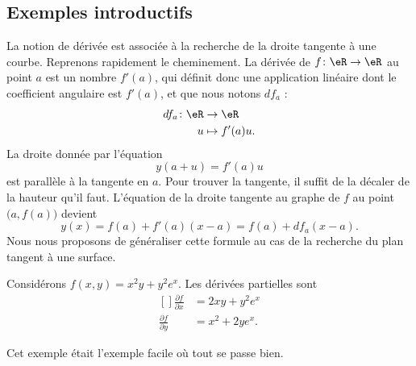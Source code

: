 \subsection{Exemples introductifs}
\label{SEBSECooLPRQooJRQCFL}

La notion de dérivée est associée à la recherche de la droite tangente à une courbe. Reprenons rapidement le cheminement. La dérivée de \( f\colon \eR\to \eR\) au point \( a\) est un nombre \( f'(a)\), qui définit donc une application linéaire dont le coefficient angulaire est \( f'(a)\), et que nous notons \( df_a\) :
\begin{equation}
	\begin{aligned}
		df_a\colon \eR & \to \eR         \\
		u              & \mapsto f'(a)u.
	\end{aligned}
\end{equation}
La droite donnée par l'équation
\begin{equation}
	y(a+u)=f'(a)u
\end{equation}
est parallèle à la tangente en \( a\). Pour trouver la tangente, il suffit de la décaler de la hauteur qu'il faut. L'équation de la droite tangente au graphe de \( f\) au point \( \big( a,f(a) \big)\) devient
\begin{equation}        \label{EqDiffRapTgDer}
	y(x)=f(a)+f'(a)(x-a)=f(a)+df_a(x-a).
\end{equation}
Nous nous proposons de généraliser cette formule au cas de la recherche du plan tangent à une surface.

\begin{example}
	Considérons \( f(x,y)=x^2y+y^2 e^{x}\). Les dérivées partielles sont
	\begin{equation}
		\begin{aligned}[]
			\frac{ \partial f }{ \partial x } & =2xy+y^2e^x \\
			\frac{ \partial f }{ \partial y } & =x^2+2ye^x.
		\end{aligned}
	\end{equation}
\end{example}

Cet exemple était l'exemple facile où tout se passe bien.

